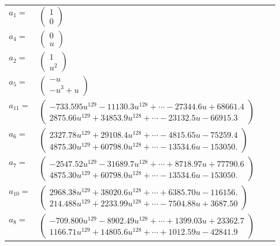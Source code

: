 \documentclass[1p]{elsarticle_modified}
\theoremstyle{definition}
\begin{document}
\begin{tabular}{m{7pt} m{180pt} m{7pt} m{180pt} }
\flushright $a_{1}=$&$\begin{pmatrix}1\\0\end{pmatrix}$ \\
\flushright $a_{4}=$&$\begin{pmatrix}0\\u\end{pmatrix}$ \\
\flushright $a_{2}=$&$\begin{pmatrix}1\\u^2\end{pmatrix}$ \\
\flushright $a_{5}=$&$\begin{pmatrix}- u\\- u^3+u\end{pmatrix}$ \\
\flushright $a_{11}=$&$\begin{pmatrix}-733.595 u^{129}-11130.3 u^{128}+\cdots-27344.6 u+68661.4\\2875.66 u^{129}+34853.9 u^{128}+\cdots-23132.5 u-66915.3\end{pmatrix}$ \\
\flushright $a_{6}=$&$\begin{pmatrix}2327.78 u^{129}+29108.4 u^{128}+\cdots-4815.65 u-75259.4\\4875.30 u^{129}+60798.0 u^{128}+\cdots-13534.6 u-153050.\end{pmatrix}$ \\
\flushright $a_{7}=$&$\begin{pmatrix}-2547.52 u^{129}-31689.7 u^{128}+\cdots+8718.97 u+77790.6\\4875.30 u^{129}+60798.0 u^{128}+\cdots-13534.6 u-153050.\end{pmatrix}$ \\
\flushright $a_{10}=$&$\begin{pmatrix}2968.38 u^{129}+38020.6 u^{128}+\cdots+6385.70 u-116156.\\214.488 u^{129}+2233.99 u^{128}+\cdots-7504.88 u+3687.50\end{pmatrix}$ \\
\flushright $a_{8}=$&$\begin{pmatrix}-709.800 u^{129}-8902.49 u^{128}+\cdots+1399.03 u+23362.7\\1166.71 u^{129}+14805.6 u^{128}+\cdots+1012.59 u-42841.9\end{pmatrix}$ \\

\end{tabular}
\end{document}

